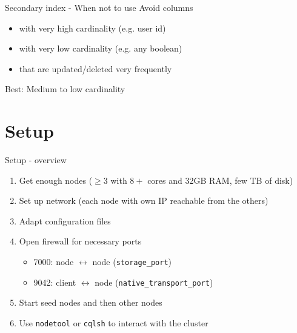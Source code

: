\documentclass[
  10pt
]{beamer}
\begin{document}
\begin{frame}{Secondary index - When not to use \cite{datastax_when_index}}
  Avoid columns
  \begin{itemize}
    \item<1-> with very high cardinality (e.g. user id)
    \item<2-> with very low cardinality (e.g. any boolean)
    \item<3-> that are updated/deleted very frequently
  \end{itemize}

  Best: Medium to low cardinality

\end{frame}

\section{Setup}  %

\begin{frame}{Setup - overview \cite{datastax_hardware}}
  \begin{enumerate}
    \item<1-> Get enough nodes ($\geq3$ with $8+$ cores and 32GB RAM, few TB of disk)
    \item<2-> Set up network (each node with own IP reachable from the others)
    \item<3-> Adapt configuration files
    \item<4-> Open firewall for necessary ports
    \begin{itemize}
      \item 7000: node $\leftrightarrow$ node (\lstinline{storage_port})
      \item 9042: client $\leftrightarrow$ node (\lstinline{native_transport_port})
    \end{itemize}
    \item<5-> Start seed nodes and then other nodes
    \item<6-> Use \lstinline{nodetool} or \lstinline{cqlsh} to interact with the cluster
  \end{enumerate}
\end{frame}
\end{document}
